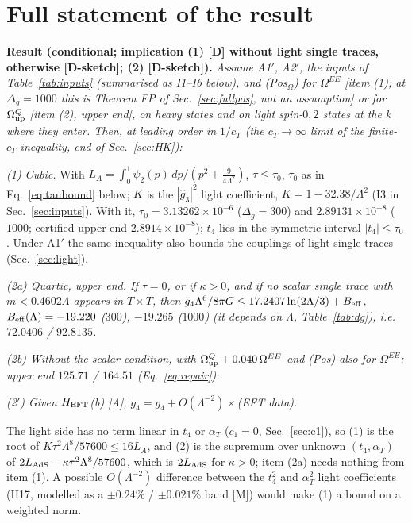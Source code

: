 \documentclass[aps,prl,onecolumn,superscriptaddress,nofootinbib]{revtex4-2}
\begin{document}
\section{Full statement of the result}
\label{sec:full}

\textbf{Result (conditional; implication (1) [D] without light single traces, otherwise [D-sketch]; (2) [D-sketch]).} \emph{Assume A1$'$, A2$'$, the inputs of
Table~\ref{tab:inputs} (summarised as I1--I6 below), and (Pos$_\Omega$) for $\Omega^{EE}$ [item (1); at $\Delta_g=1000$ this is Theorem FP of Sec.~\ref{sec:fullpos}, not an assumption] or for
$\Omega^Q_{\rm up}$ [item (2), upper end], on heavy states and on light spin-$0,2$ states at the $k$ where they
enter. Then, at leading order in $1/c_T$ (the $c_T\to\infty$ limit of the finite-$c_T$ inequality, end of
Sec.~\ref{sec:HK}):}

\emph{(1) Cubic.} With $L_A=\int_0^1\psi_2(p)\,dp/(p^2+\tfrac{9}{4\Lambda^2})$, $\tau\le\tau_0$, $\tau_0$
as in Eq.~\eqref{eq:taubound} below; $K$ is the $|\hat g_3|^2$ light coefficient, $K=1-32.38/\Lambda^2$ (I3 in Sec.~\ref{sec:inputs}). With it,
$\tau_0=3.13262\times10^{-6}$ ($\Delta_g=300$) and $2.89131\times10^{-8}$ ($1000$; certified upper end $2.8914\times10^{-8}$); $t_4$ lies in the symmetric interval
$|t_4|\le\tau_0$. Under A1$'$ the same inequality also bounds the couplings of light single traces
(Sec.~\ref{sec:light}).

\emph{(2a) Quartic, upper end. If $\tau=0$, or if $\kappa>0$, and if no scalar single trace with $m<0.4602\Lambda$
appears in $T\times T$, then $\tilde g_4\Lambda^6/8\pi G\le17.2407\ln(2\Lambda/3)+B_{\rm eff}$,
$B_{\rm eff}(\Lambda)=-19.220$ ($300$), $-19.265$ ($1000$) (it depends on $\Lambda$, Table~\ref{tab:dg}), i.e.\ $72.0406$ / $92.8135$.}

\emph{(2b) Without the scalar condition, with $\Omega^Q_{\rm up}+0.040\,\Omega^{EE}$ and (Pos) also for $\Omega^{EE}$:
upper end $125.71$ / $164.51$ (Eq.~\eqref{eq:repair}).}

\emph{(2$'$) Given $H_{\rm EFT}$(b) [A], $\tilde g_4=g_4+O(\Lambda^{-2})\times$(EFT data).}

The light side has no term linear in $t_4$ or $\alpha_T$ ($c_1=0$, Sec.~\ref{sec:c1}), so (1) is the root of
$K\tau^2\Lambda^8/57600\le16L_A$, and (2) is the supremum over unknown $(t_4,\alpha_T)$ of $2L_{\rm AdS}-\kappa\tau^2\Lambda^8/57600$,
which is $2L_{\rm AdS}$ for $\kappa>0$; item (2a) needs nothing from item (1). A possible $O(\Lambda^{-2})$ difference between the $t_4^2$ and $\alpha_T^2$
light coefficients (H17, modelled as a $\pm0.24\%$ / $\pm0.021\%$ band [M]) would make (1) a bound on a weighted
norm.
\end{document}

